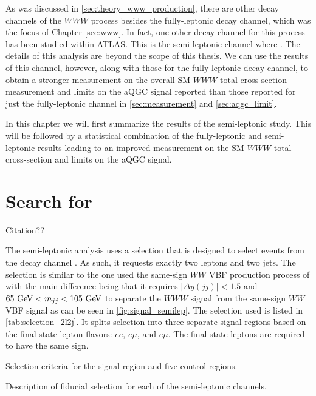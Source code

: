 
As was discussed in \sec\ref{sec:theory_www_production}, there are other decay
channels of the $WWW$ process besides the fully-leptonic decay channel,
which was the focus of Chapter \ref{sec:www}.  
In fact, one other decay channel for this process has been studied within 
ATLAS. This is the semi-leptonic channel where \wwwlljj. The details of this 
analysis are beyond the scope of this thesis. We can use the results of this channel,
however, along with those for the fully-leptonic decay channel, to obtain a stronger measurement
on the overall SM $WWW$ total cross-section measurement and limits on the aQGC signal reported than
those reported for just the fully-leptonic 
channel in \sec\ref{sec:measurement} and \sec\ref{sec:aqgc_limit}. 


In this chapter we will first summarize the results of the semi-leptonic study. 
This will be followed by a statistical combination of the fully-leptonic and semi-leptonic
results leading to an improved  
measurement on the SM $WWW$ total cross-section and limits on the 
aQGC signal.




\section{Search for \wwwlljj}
\label{sec:semilep}

Citation??

The semi-leptonic analysis uses a selection that is designed
to select events from the decay channel \wwwlljj. As such, 
it requests exactly two leptons and two jets.  The selection is similar
to the one used the same-sign $WW$ VBF production process of
\cite{PhysRevLett.113.141803} with the main difference being that
it requires $|\Delta y(jj)| < 1.5$ and $65 \GeV < m_{jj} < 105 \GeV$
to separate the $WWW$ signal from the same-sign $WW$ VBF signal as can be
seen in \fig\ref{fig:signal_semilep}. The selection used is listed in \tab\ref{tab:selection_2l2j}.
It splits selection into three separate signal regions based on the final
state lepton flavors: $ee$, $e\mu$, and $e\mu$. The final state leptons
are required to have the same sign.

\begin{table}[ht]
\tiny

\caption{\label{tab:selection_2l2j} Selection criteria for the signal region and five control regions.}
\end{table}

\begin{table}[ht!]
\centering
\begin{footnotesize}

\end{footnotesize}
\caption{Description of fiducial selection for each of the semi-leptonic channels.  }
\label{tab:fiducial_selection_2l2j}
\end{table}

